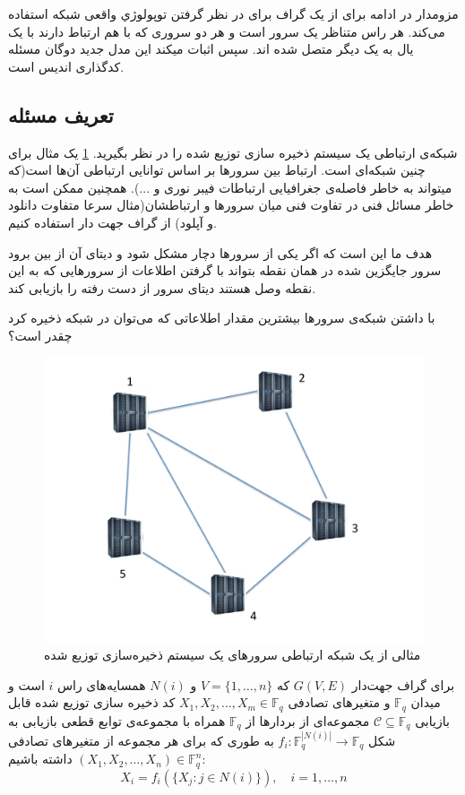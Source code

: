  مزومدار در ادامه برای از یک گراف برای در نظر گرفتن توپولوژي واقعی شبکه استفاده می‌کند. هر راس متناظر یک سرور است و هر دو سروری که با هم ارتباط دارند با یک یال به یک دیگر متصل شده اند. سپس اثبات میکند این مدل جدید دوگان مسئله کدگذاری اندیس است.
 
 \subsection{تعریف مسئله}
 شبکه‌ی ارتباطی یک سیستم ذخیره سازی توزیع شده را در نظر بگیرید.
 \ref{fig:storage-graph}
 یک مثال برای چنین شبکه‌ای است. ارتباط بین سرورها بر اساس توانایی ارتباطی آن‌ها است(که میتواند به خاطر فاصله‌ی جغرافیایی ارتباطات فیبر نوری و ...). همچنین ممکن است به خاطر مسائل فنی در تفاوت فنی میان سرورها و ارتباطشان(مثال سرعا متفاوت دانلود و آپلود) از گراف جهت دار استفاده کنیم.
 
 هدف ما این است که اگر یکی از سرورها دچار مشکل شود و دیتای آن از بین برود سرور جایگزین شده در همان نقطه بتواند با گرفتن اطلاعات از سرورهایی که به این نقطه وصل هستند دیتای سرور از دست رفته را بازیابی کند.
 
 با داشتن شبکه‌ی سرورها بیشترین مقدار اطلاعاتی که می‌توان در شبکه ذخیره کرد چقدر است؟
\begin{figure}[H]
	\centering
	\includegraphics[width=0.5\linewidth]{figs/chapter6/storage-graph}
	\caption{
		مثالی از یک شبکه ارتباطی سرورهای یک سیستم ذخیره‌سازی توزیع شده
		\cite{arya}
		}
	\label{fig:storage-graph}
\end{figure}

\begin{definition}
	برای گراف جهت‌دار
	$G(V, E)$
	که
	$V = \{1, \ldots, n\}$
	و
	$N(i)$
	همسایه‌های راس
	$i$
	است و میدان
	$\mathbb{F}_{q}$
	و متغیرهای تصادفی
	$X_1, X_2, \ldots, X_m \in \mathbb{F}_{q}$
		کد ذخیره سازی توزیع شده قابل بازیابی 
		$\mathcal{C} \subseteq \mathbb{F}_{q}$
		مجموعه‌ای از بردار‌ها از
		$\mathbb{F}_{q}$
		همراه با مجموعه‌ی توابع قطعی بازیابی به شکل
		$f_i: \mathbb{F}_q^{|N(i)|} \to \mathbb{F}_q$
		به طوری که برای هر مجموعه از متغیرهای تصادفی 
		$(X_1, X_2,\dots,X_n) \in \mathbb{F}_q^n$
		داشته باشیم:
		$$X_i = f_i(\{X_j: j \in N(i)\}), \quad i = 1,\dots,n$$
\end{definition}

